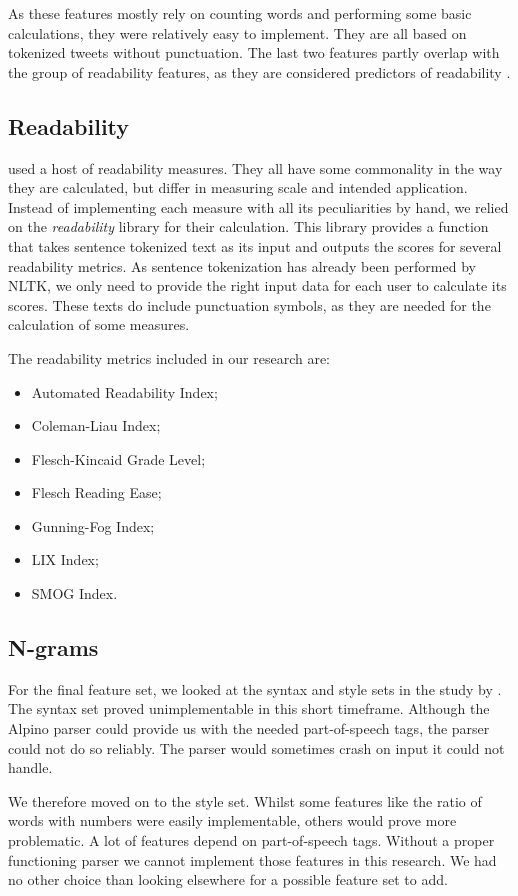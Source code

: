 \documentclass[
10pt, %
a4paper, %
oneside, %
headinclude,footinclude, %
] {book}%
\begin{document}
As these features mostly rely on counting words and performing some basic calculations, they were relatively easy to implement. They are all based on tokenized tweets without punctuation. The last two features partly overlap with the group of readability features, as they are considered predictors of readability \citep{flekova}.

\subsection{Readability}
\citet{flekova} used a host of readability measures. They all have some commonality in the way they are calculated, but differ in measuring scale and intended application. Instead of implementing each measure with all its peculiarities by hand, we relied on the \textit{readability} library \citep{readability} for their calculation. This library provides a function that takes sentence tokenized text as its input and outputs the scores for several readability metrics. As sentence tokenization has already been performed by NLTK, we only need to provide the right input data for each user to calculate its scores. These texts do include punctuation symbols, as they are needed for the calculation of some measures.

The readability metrics included in our research are:
\begin{itemize}
\item Automated Readability Index;
\item Coleman-Liau Index;
\item Flesch-Kincaid Grade Level;
\item Flesch Reading Ease;
\item Gunning-Fog Index;
\item LIX Index;
\item SMOG Index.
\end{itemize}

\subsection{N-grams}
For the final feature set, we looked at the syntax and style sets in the study by \citet{flekova}. 
The syntax set proved unimplementable in this short timeframe. Although the Alpino parser \citep{alpino} could provide us with the needed part-of-speech tags, the parser could not do so reliably. The parser would sometimes crash on input it could not handle.

We therefore moved on to the style set. Whilst some features like the ratio of words with numbers were easily implementable, others would prove more problematic. A lot of features depend on part-of-speech tags. Without a proper functioning parser we cannot implement those features in this research. 
We had no other choice than looking elsewhere for a possible feature set to add.
\end{document}
